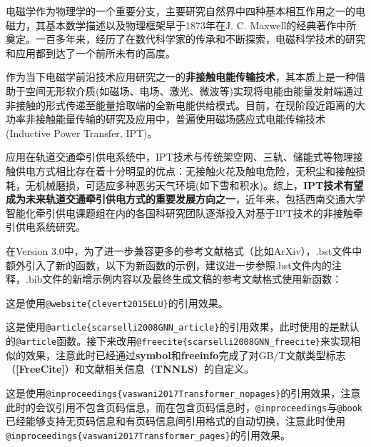 \begin{framed}
	电磁学作为物理学的一个重要分支，主要研究自然界中四种基本相互作用之一的电磁力，其基本数学描述以及物理框架早于1873年在J. C. Maxwell的经典著作\cite{Maxwell1873}中所奠定。一百多年来，经历了在数代科学家的传承和不断探索\textsuperscript{\cite{Stratton1941,Cheng1989,Jackson1999,Guru2004,Kong2008,Griffiths2012,Purcell2013,Ida2015}}，电磁科学技术的研究和应用都到达了一个前所未有的高度。
	
	作为当下电磁学前沿技术应用研究之一的\textbf{非接触电能传输技术}，其本质上是一种借助于空间无形软介质(如磁场、电场、激光、微波等)实现将电能由能量发射端通过非接触的形式传递至能量拾取端的全新电能供给模式\textsuperscript{\cite{黄学良2013}}。目前，在现阶段近距离的大功率非接触能量传输的研究及应用中，普遍使用磁场感应式电能传输技术(Inductive Power Transfer, IPT)\textsuperscript{\cite{covic2013inductive}}。
	
	应用在轨道交通牵引供电系统中，IPT技术与传统架空网、三轨、储能式等物理接触供电方式相比存在着十分明显的优点：无接触火花及触电危险，无积尘和接触损耗，无机械磨损，可适应多种恶劣天气环境(如下雪和积水)。综上，\textbf{IPT技术有望成为未来轨道交通牵引供电方式的重要发展方向之一}，近年来，包括西南交通大学智能化牵引供电课题组在内的各国科研究团队逐渐投入对基于IPT技术的非接触牵引供电系统研究\textsuperscript{\cite{Buja2015,Kim2015}}。
\end{framed}

\par
在Version 3.0中，为了进一步兼容更多的参考文献格式（比如ArXiv），.bst文件中额外引入了新的函数，以下为新函数的示例，建议进一步参照.bst文件内的注释，.bib文件的新增示例内容以及最终生成文稿的参考文献格式使用新函数：

\begin{framed}
	这是使用\verb|@website{clevert2015ELU}|的引用效果\cite{clevert2015ELU}。

	这是使用\verb|@article{scarselli2008GNN_article}|的引用效果\cite{scarselli2008GNN_article}，此时使用的是默认的\verb|@article|函数。接下来改用\verb|@freecite{scarselli2008GNN_freecite}|来实现相似的效果，注意此时已经通过\textbf{symbol}和\textbf{freeinfo}完成了对GB/T文献类型标志（\textbf{[FreeCite]}）和文献相关信息（\textbf{TNNLS}）的自定义\cite{scarselli2008GNN_freecite}。

	这是使用\verb|@inproceedings{vaswani2017Transformer_nopages}|的引用效果，注意此时的会议引用不包含页码信息\cite{vaswani2017Transformer_nopages}，而在包含页码信息时，\verb|@inproceedings|与\verb|@book|已经能够支持无页码信息和有页码信息间引用格式的自动切换，注意此时使用\verb|@inproceedings{vaswani2017Transformer_pages}|的引用效果\cite{vaswani2017Transformer_pages}。
\end{framed}